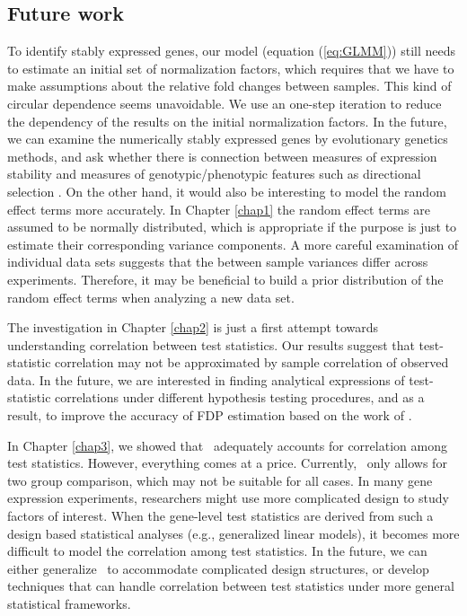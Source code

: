 \subsection{Future work}
To identify stably expressed genes, our model (equation (\ref{eq:GLMM})) still needs to estimate an 
initial set of normalization factors, which requires that we have to make assumptions about the 
relative fold changes between samples. This kind of circular dependence seems unavoidable. We use 
an one-step iteration to reduce the dependency of the results on the initial normalization factors. 
In the future, we can examine the numerically stably expressed genes by evolutionary genetics 
methods, and ask whether there is connection between measures of expression stability and measures 
of genotypic/phenotypic features such as directional selection \citep{sabeti2006positive}.
On the other hand, it would also be interesting to model the random effect terms more accurately. 
In Chapter \ref{chap1} the random effect terms are assumed to be normally distributed, which is 
appropriate 
if the purpose is just to estimate their corresponding variance components. A more careful 
examination of individual data sets suggests that the between sample variances differ across 
experiments. Therefore, it may be beneficial to build a prior distribution of the random effect 
terms when analyzing a new data set. 

The investigation in Chapter \ref{chap2} is just a first attempt towards understanding correlation 
between  test statistics. Our results suggest that test-statistic correlation may not be 
approximated by sample correlation of observed data. In the future, we are interested in finding 
analytical expressions of test-statistic correlations under different hypothesis testing 
procedures, and as a result, to improve the accuracy of FDP estimation based on the work of 
\citet{efron2007correlation}. 

In Chapter \ref{chap3}, we showed that \OurMethod~adequately accounts for correlation among test 
statistics. However, everything comes at a price. Currently, \OurMethod~only allows for two group 
comparison, which may not be suitable for all cases.
In many gene expression experiments, 
researchers  might use more complicated design to study factors of interest. When the gene-level 
test statistics are derived from such a design based statistical analyses (e.g., generalized 
linear models), it becomes more difficult to model the correlation among test statistics. In 
the future, we can either generalize \OurMethod~to accommodate complicated design structures, or 
develop techniques that can handle correlation between test statistics under 
more general statistical frameworks.  










